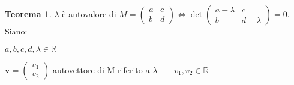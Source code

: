 \documentclass[10pt,a4paper]{article}
\theoremstyle{plain}
\theoremstyle{definition}
\newtheorem{teorema}[subsection]{Teorema}
\begin{document}
\begin{teorema}$\lambda$ è autovalore di $M=\begin{pmatrix}
	a & c \\ b & d
	\end{pmatrix} \Leftrightarrow \det{\begin{pmatrix}
		a-\lambda & c \\ b & d-\lambda
		\end{pmatrix}}=0$. \\
	
\proof
\[\]
Siano:

$a,b,c,d,\lambda\in\mathbb{R}$ 

$\mathbf{v}=
\begin{pmatrix}
v_1 \\ v_2
\end{pmatrix}$ autovettore di M riferito a $\lambda\quad\quad v_1,v_2\in\mathbb{R}$ 


\end{teorema}
\end{document}
